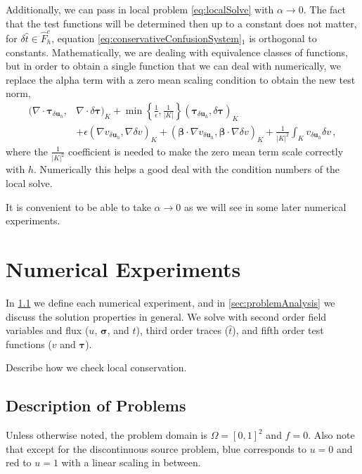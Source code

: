 \documentclass[letterpaper]{article}
\def\btau{\boldsymbol\tau}
\def\bsigma{\boldsymbol\sigma}
\def\bbeta{\boldsymbol\beta}
\newcommand{\bs}[1]{\boldsymbol{#1}}
\newcommand{\vdeltau}{v_{\delta\bs u_h}}
\newcommand{\taudeltau}{\btau_{\delta\bs u_h}}
\begin{document}
Additionally, we can pass in local problem \eqref{eq:localSolve} with
$\alpha\rightarrow0$. The fact that the test functions will be determined then
up to a constant does not matter, for $\delta\hat t\in\hat F_h^c$, equation
\eqref{eq:conservativeConfusionSystem}$_1$ is orthogonal to constants. 
Mathematically, we are dealing with equivalence classes of functions, but in order 
to obtain a single function that we can deal with numerically, we replace the alpha 
term with a zero mean scaling condition to obtain the new test norm,
\begin{align}
(\nabla\cdot\taudeltau,&\nabla\cdot\delta\btau)_K
+\min\left\{\frac{1}{\epsilon},\frac{1}{|K|}\right\}(\taudeltau,\delta\btau)_K
\nonumber\\
&+\epsilon(\nabla\vdeltau,\nabla \delta v)_K
+(\bbeta\cdot\nabla\vdeltau,\bbeta\cdot\nabla \delta v)_K
+\frac{1}{|K|^2}\int_K\vdeltau\delta v\,,
\label{eq:localSolveMod}
\end{align}
where the $\frac{1}{|K|^2}$ coefficient is needed to make the zero mean term 
scale correctly with $h$. Numerically this helps a good deal with the condition
numbers of the local solve.

It is convenient to be able to take $\alpha\rightarrow0$ as we will see in
some later numerical experiments.


\section{Numerical Experiments}
In \ref{sec:problemDescriptions} we define each numerical experiment, and in
\ref{sec:problemAnalysis} we discuss the solution properties in general. We
solve with second order field variables and flux ($u$, $\bsigma$, and $\hat
t$), third order traces ($\hat t$), and fifth order test functions ($v$ and
$\btau$).

Describe how we check local conservation.

\subsection{Description of Problems}\label{sec:problemDescriptions}
Unless otherwise noted, the problem domain is $\Omega=[0,1]^2$ and $f=0$. Also
note that except for the discontinuous source problem, blue corresponds to
$u=0$ and red to $u=1$ with a linear scaling in between.
\end{document}
